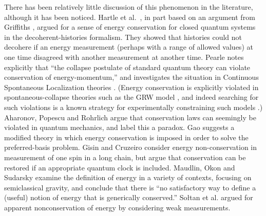 \documentclass[12pt,aps,prd,onecolumn,nofootinbib,notitlepage]{revtex4-1}
\begin{document}
There has been relatively little discussion of this phenomenon in the literature, although it has been noticed.
Hartle et al.~\cite{hartle1995conservation}, in part based on an argument from Griffiths \cite{griffiths}, argued for a sense of energy conservation for closed quantum systems in the decoherent-histories formalism.
They showed that histories could not decohere if an energy measurement (perhaps with a range of allowed values) at one time disagreed with another measurement at another time.
Pearle \cite{Pearle:2000qb} notes explicitly that ``the collapse postulate of standard quantum theory can violate conservation of energy-momentum,'' and investigates the situation in Continuous Spontaneous Localization theories \cite{Pearle:1988uh,Ghirardi:1989cn}.
(Energy conservation is explicitly violated in spontaneous-collapse theories such as the GRW model \cite{Ghirardi:1985mt}, and indeed searching for such violations is a known strategy for experimentally constraining such models \cite{vinante2016upper}.)
Aharonov, Popescu and Rohrlich  \cite{2016arXiv160905041A} argue that conservation laws can seemingly be violated in quantum mechanics, and label this a paradox.
Gao \cite{Gao:2016cmq} suggests a modified theory in which energy conservation is imposed in order to solve the preferred-basis problem.
Gisin and Cruzeiro \cite{gisin2018quantum} consider energy non-conservation in measurement of one spin in a long chain, but argue that conservation can be restored if an appropriate quantum clock is included.
Maudlin, Okon and Sudarsky \cite{Maudlin:2019bje} examine the definition of energy in a variety of contexts, focusing on semiclassical gravity, and conclude that there is ``no satisfactory way to define a (useful) notion of energy that is generically conserved.''
So{\l}tan et al. \cite{2019arXiv190706354S} argued for apparent nonconservation of energy by considering weak measurements.
\end{document}
